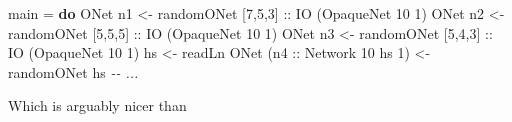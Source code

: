 \documentclass[]{article}
\newenvironment{Shaded}{}{}
\newcommand{\CommentTok}[1]{\textcolor[rgb]{0.38,0.63,0.69}{\textit{#1}}}
\newcommand{\DataTypeTok}[1]{\textcolor[rgb]{0.56,0.13,0.00}{#1}}
\newcommand{\DecValTok}[1]{\textcolor[rgb]{0.25,0.63,0.44}{#1}}
\newcommand{\FunctionTok}[1]{\textcolor[rgb]{0.02,0.16,0.49}{#1}}
\newcommand{\KeywordTok}[1]{\textcolor[rgb]{0.00,0.44,0.13}{\textbf{#1}}}
\newcommand{\NormalTok}[1]{#1}
\newcommand{\OperatorTok}[1]{\textcolor[rgb]{0.40,0.40,0.40}{#1}}
\newcommand{\OtherTok}[1]{\textcolor[rgb]{0.00,0.44,0.13}{#1}}
\begin{document}
\begin{itemize}
\begin{Shaded}
\begin{Highlighting}[]
\NormalTok{main }\OtherTok{=} \KeywordTok{do}
    \DataTypeTok{ONet}\NormalTok{ n1 }\OtherTok{\textless{}{-}}\NormalTok{ randomONet [}\DecValTok{7}\NormalTok{,}\DecValTok{5}\NormalTok{,}\DecValTok{3}\NormalTok{]}\OtherTok{ ::} \DataTypeTok{IO}\NormalTok{ (}\DataTypeTok{OpaqueNet} \DecValTok{10} \DecValTok{1}\NormalTok{)}
    \DataTypeTok{ONet}\NormalTok{ n2 }\OtherTok{\textless{}{-}}\NormalTok{ randomONet [}\DecValTok{5}\NormalTok{,}\DecValTok{5}\NormalTok{,}\DecValTok{5}\NormalTok{]}\OtherTok{ ::} \DataTypeTok{IO}\NormalTok{ (}\DataTypeTok{OpaqueNet} \DecValTok{10} \DecValTok{1}\NormalTok{)}
    \DataTypeTok{ONet}\NormalTok{ n3 }\OtherTok{\textless{}{-}}\NormalTok{ randomONet [}\DecValTok{5}\NormalTok{,}\DecValTok{4}\NormalTok{,}\DecValTok{3}\NormalTok{]}\OtherTok{ ::} \DataTypeTok{IO}\NormalTok{ (}\DataTypeTok{OpaqueNet} \DecValTok{10} \DecValTok{1}\NormalTok{)}
\NormalTok{    hs }\OtherTok{\textless{}{-}} \FunctionTok{readLn}
    \DataTypeTok{ONet}\NormalTok{ (}\OtherTok{n4 ::} \DataTypeTok{Network} \DecValTok{10}\NormalTok{ hs }\DecValTok{1}\NormalTok{) }\OtherTok{\textless{}{-}}\NormalTok{ randomONet hs}
    \CommentTok{{-}{-} ...}
\end{Highlighting}
\end{Shaded}

  Which is arguably nicer than

\begin{Shaded}
\end{Shaded}


\end{itemize}
\end{document}
